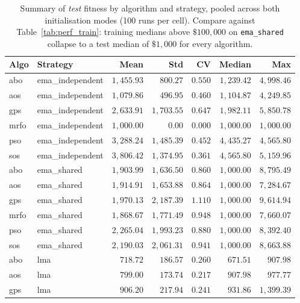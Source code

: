 \begin{table}[ht]
\centering
\caption{\label{tab:perf_test}%
Summary of \emph{test} fitness by algorithm and strategy, pooled across both
initialisation modes (100 runs per cell). Compare against
Table~\ref{tab:perf_train}: training medians above $\$100{,}000$ on
\texttt{ema\_shared} collapse to a test median of $\$1{,}000$ for every
algorithm.}
\small
\begin{tabular}{llrrrrr}
\toprule
\textbf{Algo} & \textbf{Strategy} & \textbf{Mean} & \textbf{Std} & \textbf{CV} & \textbf{Median} & \textbf{Max} \\
\midrule
abo  & ema\_independent & $1{,}455.93$ & $800.27$     & $0.550$ & $1{,}239.42$ & $4{,}998.46$ \\
aos  & ema\_independent & $1{,}079.86$ & $496.95$     & $0.460$ & $1{,}104.87$ & $4{,}249.85$ \\
gps  & ema\_independent & $2{,}633.91$ & $1{,}703.55$ & $0.647$ & $1{,}982.11$ & $5{,}850.78$ \\
mrfo & ema\_independent & $1{,}000.00$ & $0.00$       & $0.000$ & $1{,}000.00$ & $1{,}000.00$ \\
pso  & ema\_independent & $3{,}288.24$ & $1{,}485.39$ & $0.452$ & $4{,}435.27$ & $4{,}565.80$ \\
sos  & ema\_independent & $3{,}806.42$ & $1{,}374.95$ & $0.361$ & $4{,}565.80$ & $5{,}159.96$ \\
\midrule
abo  & ema\_shared      & $1{,}903.99$ & $1{,}636.50$ & $0.860$ & $1{,}000.00$ & $8{,}795.49$ \\
aos  & ema\_shared      & $1{,}914.91$ & $1{,}653.88$ & $0.864$ & $1{,}000.00$ & $7{,}284.67$ \\
gps  & ema\_shared      & $1{,}970.13$ & $2{,}187.39$ & $1.110$ & $1{,}000.00$ & $9{,}614.94$ \\
mrfo & ema\_shared      & $1{,}868.67$ & $1{,}771.49$ & $0.948$ & $1{,}000.00$ & $7{,}660.07$ \\
pso  & ema\_shared      & $2{,}265.04$ & $1{,}993.23$ & $0.880$ & $1{,}000.00$ & $8{,}392.40$ \\
sos  & ema\_shared      & $2{,}190.03$ & $2{,}061.31$ & $0.941$ & $1{,}000.00$ & $8{,}663.88$ \\
\midrule
abo  & lma             & $718.72$ & $186.57$ & $0.260$ & $671.51$ & $907.98$   \\
aos  & lma             & $799.00$ & $173.74$ & $0.217$ & $907.98$ & $977.77$   \\
gps  & lma             & $906.20$ & $217.94$ & $0.241$ & $931.86$ & $1{,}399.39$ \\

\end{tabular}
\end{table}
